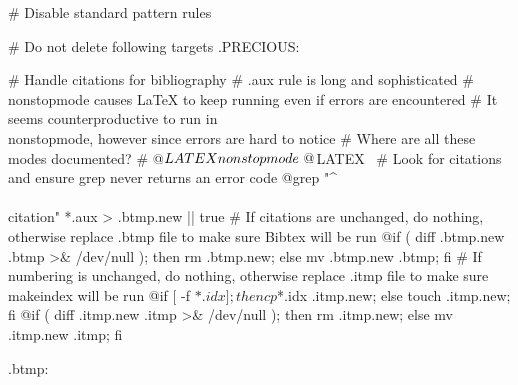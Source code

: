 # Disable standard pattern rules

# Do not delete following targets
.PRECIOUS: %

# Handle citations for bibliography
# .aux rule is long and sophisticated
# \\nonstopmode causes LaTeX to keep running even if errors are encountered
# It seems counterproductive to run in \\nonstopmode, however since errors are hard to notice
# Where are all these modes documented?
#	@${LATEX} \\nonstopmode \
	@${LATEX} \
# Look for citations and ensure grep never returns an error code
	@grep "^\\\\citation" *.aux > .btmp.new || true
# If citations are unchanged, do nothing, otherwise replace .btmp file to make sure Bibtex will be run
	@if ( diff .btmp.new .btmp >& /dev/null ); then rm .btmp.new; else mv .btmp.new .btmp; fi
# If numbering is unchanged, do nothing, otherwise replace .itmp file to make sure makeindex will be run
	@if [ -f $*.idx ]; then cp $*.idx .itmp.new; else touch .itmp.new; fi
	@if ( diff .itmp.new .itmp >& /dev/null ); then rm .itmp.new; else mv .itmp.new .itmp; fi

.btmp:

